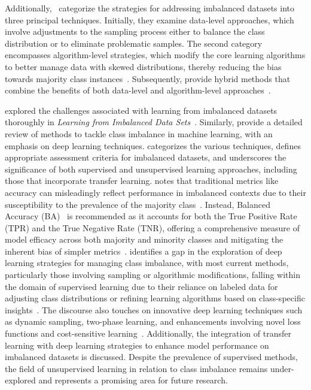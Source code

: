Additionally,~\citet{Data_algo_hybrid_krawczyk2016learning} categorize the strategies for addressing imbalanced datasets into three principal techniques. Initially, they examine data-level approaches, which involve adjustments to the sampling process either to balance the class distribution or to eliminate problematic samples. The second category encompasses algorithm-level strategies, which modify the core learning algorithms to better manage data with skewed distributions, thereby reducing the bias towards majority class instances~\citep{Data_algo_hybrid_krawczyk2016learning, Fernndez2018LearningFI}. Subsequently,\citet{Data_algo_hybrid_krawczyk2016learning} provide hybrid methods that combine the benefits of both data-level and algorithm-level approaches~\citep{Navo_Im_chakrabarty2020navo}.

\citet{Fernndez2018LearningFI} explored the challenges associated with learning from imbalanced datasets thoroughly in \textit{Learning from Imbalanced Data Sets}~\citep{Fernndez2018LearningFI}. Similarly, \citet{Survey_DL_Taghi_article} provide a detailed review of methods to tackle class imbalance in machine learning, with an emphasis on deep learning techniques. \citet{Survey_DL_Taghi_article} categorizes the various techniques, defines appropriate assessment criteria for imbalanced datasets, and underscores the significance of both supervised and unsupervised learning approaches, including those that incorporate transfer learning. \citet{Survey_DL_Taghi_article} notes that traditional metrics like accuracy can misleadingly reflect performance in imbalanced contexts due to their susceptibility to the prevalence of the majority class~\citep{Fernndez2018LearningFI, Survey_DL_Taghi_article}. Instead, Balanced Accuracy (BA)~\citep{bal_acc_paper_brodersen2010balanced} is recommended as it accounts for both the True Positive Rate (TPR) and the True Negative Rate (TNR), offering a comprehensive measure of model efficacy across both majority and minority classes and mitigating the inherent bias of simpler metrics~\citep{18_wang2016training}. \citet{Survey_DL_Taghi_article} identifies a gap in the exploration of deep learning strategies for managing class imbalance, with most current methods, particularly those involving sampling or algorithmic modifications, falling within the domain of supervised learning due to their reliance on labeled data for adjusting class distributions or refining learning algorithms based on class-specific insights~\citep{Survey_DL_Taghi_article}. The discourse also touches on innovative deep learning techniques such as dynamic sampling, two-phase learning, and enhancements involving novel loss functions and cost-sensitive learning~\citep{Survey_DL_Taghi_article}. Additionally, the integration of transfer learning with deep learning strategies to enhance model performance on imbalanced datasets is discussed. Despite the prevalence of supervised methods, the field of unsupervised learning in relation to class imbalance remains under-explored and represents a promising area for future research.

